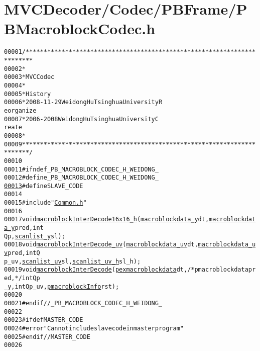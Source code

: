 \hypertarget{_p_b_macroblock_codec_8h_source}{
\section{MVCDecoder/Codec/PBFrame/PBMacroblockCodec.h}
}


\begin{footnotesize}\begin{alltt}
00001 \textcolor{comment}{/************************************************************************}
00002 \textcolor{comment}{ *}
00003 \textcolor{comment}{ * MVC Codec}
00004 \textcolor{comment}{ * }
00005 \textcolor{comment}{ * History}
00006 \textcolor{comment}{ * 2008-11-29           Weidong Hu              Tsinghua University             R
      eorganize}
00007 \textcolor{comment}{ * 2006-2008            Weidong Hu              Tsinghua University             C
      reate}
00008 \textcolor{comment}{ * }
00009 \textcolor{comment}{ ************************************************************************/}
00010 
00011 \textcolor{preprocessor}{#ifndef \_PB\_MACROBLOCK\_CODEC\_H\_WEIDONG\_}
00012 \textcolor{preprocessor}{}\textcolor{preprocessor}{#define \_PB\_MACROBLOCK\_CODEC\_H\_WEIDONG\_}
\hypertarget{_p_b_macroblock_codec_8h_source_l00013}{}\hyperlink{_p_b_macroblock_codec_8h_a995f6a4907273b8d56b6543ab1a57d17}{00013} \textcolor{preprocessor}{}\textcolor{preprocessor}{#define SLAVE\_CODE}
00014 \textcolor{preprocessor}{}
00015 \textcolor{preprocessor}{#include "\hyperlink{_common_8h}{Common.h}"}
00016 
00017 \textcolor{keywordtype}{void} \hyperlink{_p_b_macroblock_codec_8h_a9f608e07f12bb85e8d1f78d0d21a4274}{macroblockInterDecode16x16_h}(\hyperlink{_types_8h_a15eca744b460ea898a5e04df2899d49f}{macroblockdata_y} dt, \hyperlink{_types_8h_a15eca744b460ea898a5e04df2899d49f}{macroblockdata_y} pred, \textcolor{keywordtype}{int
      } Qp, \hyperlink{_types_8h_accfb15e4d2eec611f79a2dcbf8aea289}{scanlist_y} sl);
00018 \textcolor{keywordtype}{void} \hyperlink{_p_b_macroblock_codec_8cpp_a907948e514ef3d05386e93a64d576c02}{macroblockInterDecode_uv}(\hyperlink{_types_8h_abb0aad4f6cc5fb3beadf8f4df08da50f}{macroblockdata_uv} dt, \hyperlink{_types_8h_abb0aad4f6cc5fb3beadf8f4df08da50f}{macroblockdata_uv} pred, \textcolor{keywordtype}{int} Q
      p\_uv, \hyperlink{_types_8h_a4a042a6cb76a44ae3f79ece0d72bccde}{scanlist_uv} sl, \hyperlink{_types_8h_a7afd079e016df28b6c6b0f2eb7bf70c2}{scanlist_uv_h} sl\_h);
00019 \textcolor{keywordtype}{void} \hyperlink{_p_b_macroblock_codec_8cpp_ad7127f8c7dabe086c8648f61be463740}{macroblockInterDecode}(\hyperlink{structexmacroblockdata}{pexmacroblockdata} dt, \textcolor{comment}{/*pmacroblockdata pred, */}\textcolor{keywordtype}{int} Qp
      \_y, \textcolor{keywordtype}{int} Qp\_uv, \hyperlink{structmacroblock_info}{pmacroblockInfo} rst);
00020 
00021 \textcolor{preprocessor}{#endif //\_PB\_MACROBLOCK\_CODEC\_H\_WEIDONG\_}
00022 \textcolor{preprocessor}{}
00023 \textcolor{preprocessor}{#ifdef MASTER\_CODE}
00024 \textcolor{preprocessor}{}\textcolor{preprocessor}{#error "Can not include slave code in master program"}
00025 \textcolor{preprocessor}{}\textcolor{preprocessor}{#endif // MASTER\_CODE}
00026 \textcolor{preprocessor}{}
\end{alltt}\end{footnotesize}
